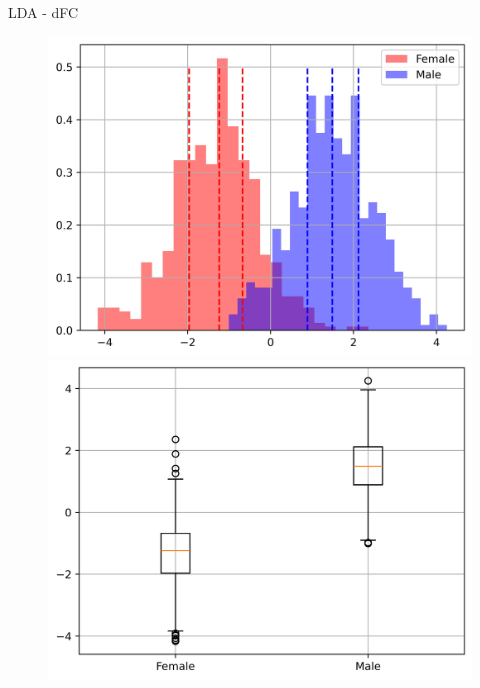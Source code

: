 \documentclass{beamer}
\begin{document}
\begin{frame}{LDA - dFC}
\begin{figure}[H]
{\begin{minipage}[b]{0.3\textwidth}
                \includegraphics[width=1\textwidth]{../Analysis/LDA/node=25_size=480_step=180_rho=0.1/hist.jpg}
                \includegraphics[width=1\textwidth]{../Analysis/LDA/node=25_size=480_step=180_rho=0.1/box.jpg}
            \end{minipage}
        }
\end{figure}
\end{frame}
\end{document}
